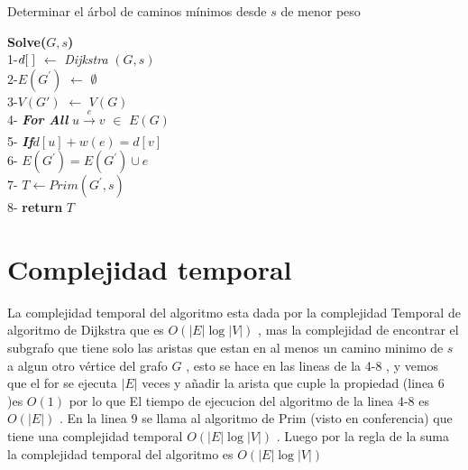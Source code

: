 \documentclass{article}
\begin{document}
    \begin{algorithm}[H]
        \caption{Determinar el \'arbol de caminos m\'inimos desde $s$ de menor peso }
        \textbf{Solve($G,s$)}\\ 
        1-\hspace*{0.5em}$d[\hspace*{0.1cm}]$ $\leftarrow $ \textit{Dijkstra} $\left(G,s\right)$ \\  
        2-\hspace*{0.5em}$E (G^{'})$ $\leftarrow$ $\emptyset$ \\ 
        3-\hspace*{0.5em}$V(G')$ $\leftarrow$ $V(G)$\\ 
        4-\hspace*{0.5em} \textbf{\textit{For All }} $u \xrightarrow[]{e} v$  $\in$ $E(G)$\\ 
        5-\hspace*{3em} \textbf{\textit{If}}$d[u] + w(e) = d[v] $\\
        6-\hspace*{6em} $E(G^{'}) = E(G^{'})  \cup  e $ \\ 
        7-\hspace*{0.5em} $T \leftarrow  Prim(G^{'} , s)$\\
        8-\hspace*{0.5em} \textbf{return } $T$ 
    \end{algorithm}
    
    

    \section{Complejidad temporal}

    \noindent La complejidad temporal del algoritmo esta dada por la complejidad Temporal de algoritmo de Dijkstra 
    que es $O(|E|\log |V|)$ , mas la complejidad de encontrar el subgrafo que tiene solo las aristas que estan en al menos 
    un camino minimo de $s$ a algun otro v\'ertice del grafo $G$ , esto se hace en las lineas de la 4-8 , y vemos que el for se 
    ejecuta $|E|$ veces  y a\~nadir la arista que cuple la propiedad (linea 6 )es $O(1)$ por lo que El tiempo de ejecucion del algoritmo 
    de la linea 4-8 es $O(|E|)$ . En la linea 9 se llama al algoritmo de Prim (visto en conferencia) que tiene una complejidad temporal
    $O(|E|\log |V|)$ . Luego por la regla de la suma la complejidad temporal del algoritmo es  $O(|E|\log |V|)$
\end{document}
